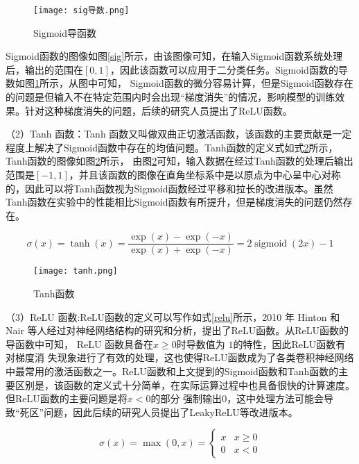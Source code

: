 \begin{figure}[htbp]
    \centering
    \texttt{[image: sig导数.png]}
    \caption{Sigmoid导函数}
    \label{sigd}
\end{figure}

Sigmoid函数的图像如图\ref{sig}所示，由该图像可知，在输入Sigmoid函数系统处理后，输出的范围在$[0,1]$，因此该函数可以应用于二分类任务。Sigmoid函数的导数如图\ref{sigd}所示，从图中可知，
Sigmoid函数的微分容易计算，但是Sigmoid函数存在的问题是但输入不在特定范围内时会出现“梯度消失”的情况，影响模型的训练效果。针对这种梯度消失的问题，后续的研究人员提出了ReLU函数。

（2）Tanh 函数：Tanh 函数又叫做双曲正切激活函数，该函数的主要贡献是一定程度上解决了Sigmoid函数中存在的均值问题。Tanh函数的定义式如式\ref{tanh}所示，Tanh函数的图像如图\ref{tanh}所示，
由图\ref{tanh}可知，输入数据在经过Tanh函数的处理后输出范围是$[-1,1]$，并且该函数的图像在直角坐标系中是以原点为中心呈中心对称的，因此可以将Tanh函数视为Sigmoid函数经过平移和拉长的改进版本。虽然Tanh函数在实验中的性能相比Sigmoid函数有所提升，但是梯度消失的问题仍然存在。

\begin{equation}
    \sigma(x)=\tanh (x)=\frac{\exp (x)-\exp (-x)}{\exp (x)+\exp (-x)}=2 \operatorname{sigmoid}(2 x)-1
    \label{tan}
\end{equation}

\begin{figure}[htbp]
    \centering
    \texttt{[image: tanh.png]}
    \caption{Tanh函数}
    \label{tanh}
\end{figure}

（3）ReLU 函数:ReLU函数的定义可以写作如式\ref{relu}所示，2010 年
Hinton 和 Nair 等人经过对神经网络结构的研究和分析，提出了ReLU函数。从ReLU函数的导函数中可知， ReLU 函数具备在$x\ge 0$时导数值为 $1$的特性，因此ReLU函数有对梯度消
失现象进行了有效的处理，这也使得ReLU函数成为了各类卷积神经网络中最常用的激活函数之一\cite{xu2015empirical}。ReLU函数和上文提到的Sigmoid函数和Tanh函数的主要区别是，该函数的定义式十分简单，在实际运算过程中也具备很快的计算速度。但ReLU函数的主要问题是将$ x<0$的部分
强制输出$0$，这中处理方法可能会导致“死区”问题，因此后续的研究人员提出了LeakyReLU\cite{maas2013rectifier}等改进版本。

\begin{equation}
    \sigma(x)=\max (0, x)= \begin{cases}x & x \geq 0 \\ 0 & x<0\end{cases}
    \label{relu}
\end{equation}

